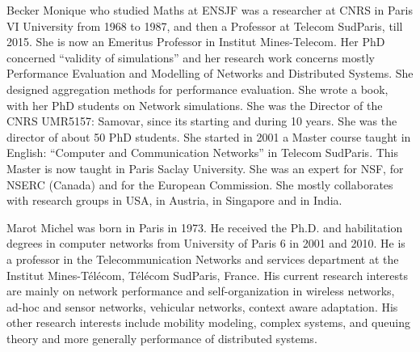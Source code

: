 \documentclass[journal]{IEEEtran}
\begin{document}
\begin{IEEEbiography}%
{Becker Monique}
who studied Maths at ENSJF was a researcher at CNRS in Paris VI University from 1968 to 1987, and then a Professor at Telecom SudParis, till 2015. She is now an Emeritus Professor in Institut Mines-Telecom.
Her PhD concerned “validity of simulations” and her research work concerns mostly Performance Evaluation and Modelling of Networks and Distributed Systems. She designed aggregation methods for performance evaluation. She wrote a book, with her PhD students on Network simulations. 
She was the Director of the CNRS UMR5157: Samovar, since its starting and during 10 years.
She was the director of about 50 PhD students.
She started in 2001 a Master course taught in English: “Computer and Communication Networks” in Telecom SudParis. This Master is now taught in Paris Saclay University.
She was an expert for NSF, for NSERC (Canada) and for the European Commission.
She mostly collaborates with research groups in USA, in Austria, in Singapore and in India.

\end{IEEEbiography}



\begin{IEEEbiography}%
{Marot Michel}
was born in Paris in 1973. He received the Ph.D. and habilitation degrees in computer networks from University of Paris 6 in 2001 and 2010. He is a professor in the Telecommunication Networks and services department at the Institut Mines-T\'el\'ecom, T\'el\'ecom SudParis, France. His current research interests are mainly on network performance and self-organization in wireless networks, ad-hoc and sensor networks, vehicular networks, context aware adaptation. His other research interests include mobility modeling, complex systems, and queuing theory and more generally performance of distributed systems.
\end{IEEEbiography}
\end{document}
